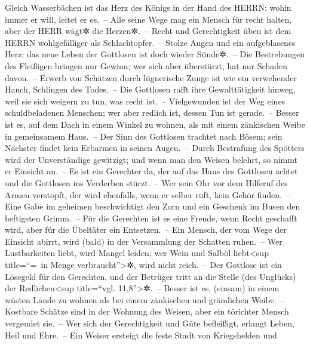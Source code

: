 Gleich Wasserbächen ist das Herz des Königs in der Hand
des HERRN: wohin immer er will, leitet er es.~-- Alle
seine Wege mag ein Mensch für recht halten, aber der HERR wägt✲ die
Herzen✲.~-- Recht und Gerechtigkeit üben ist dem HERRN
wohlgefälliger als Schlachtopfer.~-- Stolze Augen und ein
aufgeblasenes Herz: das neue Leben der Gottlosen ist doch wieder
Sünde✲.~-- Die Bestrebungen des Fleißigen bringen nur
Gewinn; wer sich aber überstürzt, hat nur Schaden davon.~--
Erwerb von Schätzen durch lügnerische Zunge ist wie ein
verwehender Hauch, Schlingen des Todes.~-- Die Gottlosen
rafft ihre Gewalttätigkeit hinweg, weil sie sich weigern zu tun, was
recht ist.~-- Vielgewunden ist der Weg eines
schuldbeladenen Menschen; wer aber redlich ist, dessen Tun ist
gerade.~-- Besser ist es, auf dem Dach in einem Winkel zu
wohnen, als mit einem zänkischen Weibe in gemeinsamem Haus.~--
Der Sinn des Gottlosen trachtet nach Bösem; sein Nächster
findet kein Erbarmen in seinen Augen.~-- Durch Bestrafung
des Spötters wird der Unverständige gewitzigt; und wenn man den Weisen
belehrt, so nimmt er Einsicht an.~-- Es ist ein Gerechter
da, der auf das Haus des Gottlosen achtet und die Gottlosen ins
Verderben stürzt.~-- Wer sein Ohr vor dem Hilferuf des
Armen verstopft, der wird ebenfalls, wenn er selber ruft, kein Gehör
finden.~-- Eine Gabe im geheimen beschwichtigt den Zorn
und ein Geschenk im Busen den heftigsten Grimm.~-- Für
die Gerechten ist es eine Freude, wenn Recht geschafft wird, aber für
die Übeltäter ein Entsetzen.~-- Ein Mensch, der vom Wege
der Einsicht abirrt, wird (bald) in der Versammlung der Schatten
ruhen.~-- Wer Lustbarkeiten liebt, wird Mangel leiden;
wer Wein und Salböl liebt\textless sup title=``=~in Menge
verbraucht''\textgreater✲, wird nicht reich.~-- Der
Gottlose ist ein Lösegeld für den Gerechten, und der Betrüger tritt an
die Stelle (des Unglücks) der Redlichen\textless sup title=``vgl.
11,8''\textgreater✲.~-- Besser ist es, (einsam) in einem
wüsten Lande zu wohnen als bei einem zänkischen und grämlichen Weibe.~--
Kostbare Schätze sind in der Wohnung des Weisen, aber ein
törichter Mensch vergeudet sie.~-- Wer sich der
Gerechtigkeit und Güte befleißigt, erlangt Leben, Heil und Ehre.~--
Ein Weiser ersteigt die feste Stadt von Kriegshelden und
